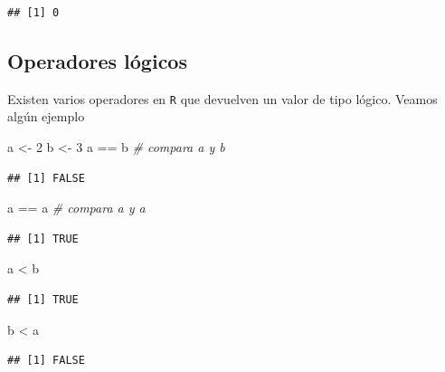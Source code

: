 \documentclass[
]{book}
\newenvironment{Shaded}{\begin{snugshade}}{\end{snugshade}}
\newcommand{\CommentTok}[1]{\textcolor[rgb]{0.56,0.35,0.01}{\textit{#1}}}
\newcommand{\DecValTok}[1]{\textcolor[rgb]{0.00,0.00,0.81}{#1}}
\newcommand{\NormalTok}[1]{#1}
\newcommand{\OtherTok}[1]{\textcolor[rgb]{0.56,0.35,0.01}{#1}}
\newcommand{\SpecialCharTok}[1]{\textcolor[rgb]{0.00,0.00,0.00}{#1}}
\theoremstyle{break}
\theoremstyle{nonumberplain}
\begin{document}
\begin{verbatim}
## [1] 0
\end{verbatim}

\hypertarget{operadores-luxf3gicos}{%
\subsection{Operadores lógicos}\label{operadores-luxf3gicos}}

Existen varios operadores en
\texttt{R} que devuelven un valor de tipo lógico. Veamos algún ejemplo

\begin{Shaded}
\begin{Highlighting}[]
\NormalTok{a }\OtherTok{\textless{}{-}} \DecValTok{2}
\NormalTok{b }\OtherTok{\textless{}{-}} \DecValTok{3}
\NormalTok{a }\SpecialCharTok{==}\NormalTok{ b  }\CommentTok{\# compara a y b}
\end{Highlighting}
\end{Shaded}

\begin{verbatim}
## [1] FALSE
\end{verbatim}

\begin{Shaded}
\begin{Highlighting}[]
\NormalTok{a }\SpecialCharTok{==}\NormalTok{ a  }\CommentTok{\# compara a y a}
\end{Highlighting}
\end{Shaded}

\begin{verbatim}
## [1] TRUE
\end{verbatim}

\begin{Shaded}
\begin{Highlighting}[]
\NormalTok{a }\SpecialCharTok{\textless{}}\NormalTok{ b}
\end{Highlighting}
\end{Shaded}

\begin{verbatim}
## [1] TRUE
\end{verbatim}

\begin{Shaded}
\begin{Highlighting}[]
\NormalTok{b }\SpecialCharTok{\textless{}}\NormalTok{ a}
\end{Highlighting}
\end{Shaded}

\begin{verbatim}
## [1] FALSE
\end{verbatim}
\end{document}
